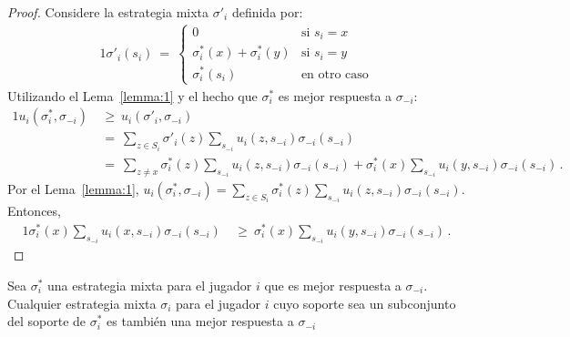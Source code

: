 \begin{proof}
Considere la estrategia mixta $\sigma'_i$ definida por:
\begin{alignat}{1}
	\sigma'_{i}(s_i)\ =\  
	\begin{cases}
		0 &  \text{si } s_i = x \\
		\sigma^*_i(x) + \sigma^*_i(y) & \text{si } s_i = y \\
		\sigma^*_i(s_i) & \text{en otro caso} 
	\end{cases}
\end{alignat}
Utilizando el Lema~\ref{lemma:1} y el hecho que $\sigma^*_i$ es mejor respuesta a $\sigma_{-i}$:
\begin{alignat}{1}
  u_i(\sigma^*_i, \sigma_{-i})\ 
    &\geq\ u_i(\sigma'_i, \sigma_{-i}) \\
    &=\ \sum_{z \in S_i} \sigma'_i(z) \sum_{s_{-i}} u_i(z,s_{-i}) \sigma_{-i}(s_{-i}) \\
    &=\ \sum_{z\neq x} \sigma^*_i(z) \sum_{s_{-i}} u_i(z,s_{-i}) \sigma_{-i}(s_{-i}) + \sigma^*_i(x)\sum_{s_{-i}} u_i(y,s_{-i})\sigma_{-i}(s_{-i}) \,.
\end{alignat}
Por el Lema~\ref{lemma:1},
$u_i(\sigma^*_i, \sigma_{-i})=\sum_{z \in S_i} \sigma^*_i(z) \sum_{s_{-i}} u_i(z,s_{-i}) \sigma_{-i}(s_{-i})$. Entonces,
\begin{alignat}{1}
  \label{eq:ineq-ganancias}
  \sigma^*_i(x) \sum_{s_{-i}} u_i(x,s_{-i}) \sigma_{-i}(s_{-i})\
    &\geq\ \sigma^*_i(x)\sum_{s_{-i}} u_i(y,s_{-i}) \sigma_{-i}(s_{-i}) \,.
\end{alignat}
\end{proof}

\begin{theorem}
\label{theo:mejor-respuesta}
Sea $\sigma^*_i$ una estrategia mixta para el jugador $i$ que es mejor respuesta a $\sigma_{-i}$. Cualquier estrategia mixta $\sigma_i$ para el jugador $i$ cuyo soporte sea un subconjunto del soporte de $\sigma^*_i$ es tambi\'en una mejor respuesta a $\sigma_{-i}$
\end{theorem}

